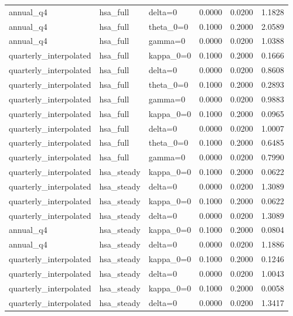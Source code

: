 \begin{tabular}{lllrrr}
annual\_q4 & hsa\_full & delta=0 & 0.0000 & 0.0200 & 1.1828 \\
annual\_q4 & hsa\_full & theta\_0=0 & 0.1000 & 0.2000 & 2.0589 \\
annual\_q4 & hsa\_full & gamma=0 & 0.0000 & 0.0200 & 1.0388 \\
quarterly\_interpolated & hsa\_full & kappa\_0=0 & 0.1000 & 0.2000 & 0.1666 \\
quarterly\_interpolated & hsa\_full & delta=0 & 0.0000 & 0.0200 & 0.8608 \\
quarterly\_interpolated & hsa\_full & theta\_0=0 & 0.1000 & 0.2000 & 0.2893 \\
quarterly\_interpolated & hsa\_full & gamma=0 & 0.0000 & 0.0200 & 0.9883 \\
quarterly\_interpolated & hsa\_full & kappa\_0=0 & 0.1000 & 0.2000 & 0.0965 \\
quarterly\_interpolated & hsa\_full & delta=0 & 0.0000 & 0.0200 & 1.0007 \\
quarterly\_interpolated & hsa\_full & theta\_0=0 & 0.1000 & 0.2000 & 0.6485 \\
quarterly\_interpolated & hsa\_full & gamma=0 & 0.0000 & 0.0200 & 0.7990 \\
quarterly\_interpolated & hsa\_steady & kappa\_0=0 & 0.1000 & 0.2000 & 0.0622 \\
quarterly\_interpolated & hsa\_steady & delta=0 & 0.0000 & 0.0200 & 1.3089 \\
quarterly\_interpolated & hsa\_steady & kappa\_0=0 & 0.1000 & 0.2000 & 0.0622 \\
quarterly\_interpolated & hsa\_steady & delta=0 & 0.0000 & 0.0200 & 1.3089 \\
annual\_q4 & hsa\_steady & kappa\_0=0 & 0.1000 & 0.2000 & 0.0804 \\
annual\_q4 & hsa\_steady & delta=0 & 0.0000 & 0.0200 & 1.1886 \\
quarterly\_interpolated & hsa\_steady & kappa\_0=0 & 0.1000 & 0.2000 & 0.1246 \\
quarterly\_interpolated & hsa\_steady & delta=0 & 0.0000 & 0.0200 & 1.0043 \\
quarterly\_interpolated & hsa\_steady & kappa\_0=0 & 0.1000 & 0.2000 & 0.0058 \\
quarterly\_interpolated & hsa\_steady & delta=0 & 0.0000 & 0.0200 & 1.3417 \\
\bottomrule
\end{tabular}
